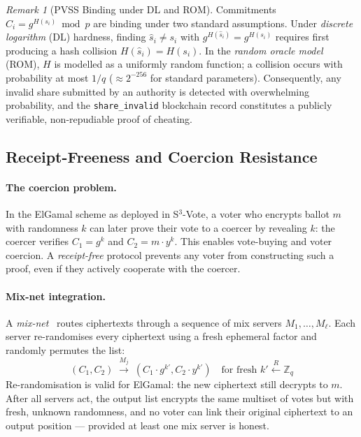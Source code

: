 \documentclass[12pt,a4paper]{article}
\theoremstyle{definition}
\theoremstyle{remark}
\newtheorem{remark}{Remark}[section]
\begin{document}
\begin{remark}[PVSS Binding under DL and ROM]
  Commitments $C_i = g^{H(s_i)} \bmod p$ are binding under two standard
  assumptions. Under \emph{discrete logarithm} (DL) hardness, finding
  $\hat{s}_i \neq s_i$ with $g^{H(\hat{s}_i)} = g^{H(s_i)}$ requires
  first producing a hash collision $H(\hat{s}_i) = H(s_i)$.
  In the \emph{random oracle model} (ROM), $H$ is modelled as a uniformly
  random function; a collision occurs with probability at most $1/q$
  ($\approx 2^{-256}$ for standard parameters).
  Consequently, any invalid share submitted by an authority is detected
  with overwhelming probability, and the \texttt{share\_invalid} blockchain
  record constitutes a publicly verifiable, non-repudiable proof of cheating.
\end{remark}

\subsection{Receipt-Freeness and Coercion Resistance}

\paragraph{The coercion problem.}
In the ElGamal scheme as deployed in S$^3$-Vote, a voter who encrypts
ballot $m$ with randomness $k$ can later prove their vote to a coercer by
revealing $k$: the coercer verifies $C_1 = g^k$ and $C_2 = m \cdot y^k$.
This enables vote-buying and voter coercion.
A \emph{receipt-free} protocol prevents any voter from constructing such
a proof, even if they actively cooperate with the coercer.

\paragraph{Mix-net integration.}
A \emph{mix-net}~\cite{chaum1988} routes ciphertexts through a sequence of
mix servers $M_1, \ldots, M_\ell$.
Each server re-randomises every ciphertext using a fresh ephemeral factor
and randomly permutes the list:
\begin{equation}
  (C_1, C_2) \;\xrightarrow{M_j}\; (C_1 \cdot g^{k'}, C_2 \cdot y^{k'})
  \quad \text{for fresh } k' \xleftarrow{R} \mathbb{Z}_q
\end{equation}
Re-randomisation is valid for ElGamal: the new ciphertext still decrypts
to $m$.
After all servers act, the output list encrypts the same multiset of votes
but with fresh, unknown randomness, and no voter can link their original
ciphertext to an output position — provided at least one mix server is honest.
\end{document}
